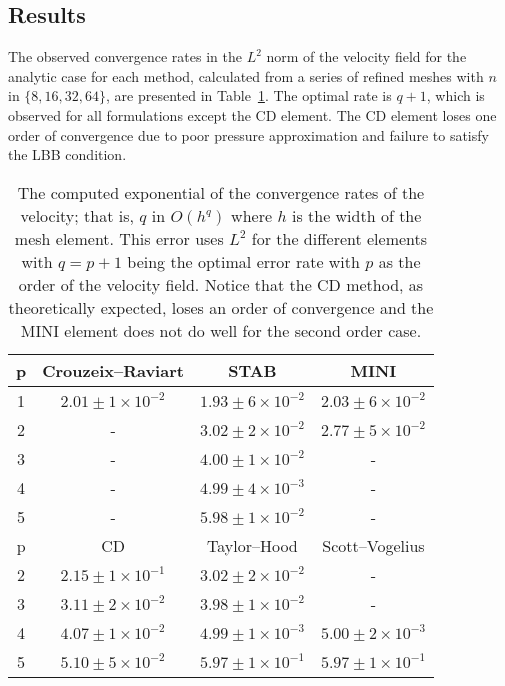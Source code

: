 \subsection{Results}

The observed convergence rates in the $L^{2}$ norm of the velocity
field for the analytic case for each method, calculated from a series
of refined meshes with $n$ in $\{8, 16, 32, 64\}$, are presented in
Table~\ref{tab:terrel:vel_error}. The optimal rate is $q + 1$, which is
observed for all formulations except the CD element.  The CD element
loses one order of convergence due to poor pressure approximation and
failure to satisfy the LBB condition.

\begin{table}[!t]
\centering
  \small
  \begin{tabular}{cccc}
    \toprule
    p  & Crouzeix--Raviart &  STAB &  MINI \\
    \midrule
    1 & $2.01\pm 1 \times 10^{-2}$ & $1.93\pm 6 \times 10^{-2}$ & $2.03\pm 6 \times 10^{-2}$ \\
    2 & -                          & $3.02\pm 2 \times 10^{-2}$ & $2.77\pm 5 \times 10^{-2}$ \\
    3 & -                          & $4.00\pm 1 \times 10^{-2}$ & - \\
    4 & -                          & $4.99\pm 4 \times 10^{-3}$ & - \\
    5 & -                          & $5.98\pm 1 \times 10^{-2}$ & -\\
    \midrule
    p  &  CD  & Taylor--Hood & Scott--Vogelius \\
    \midrule
    2 & $2.15 \pm 1 \times 10^{-1}$ & $3.02 \pm 2 \times 10^{-2}$ & -  \\
    3 & $3.11 \pm 2 \times 10^{-2}$ & $3.98 \pm 1 \times 10^{-2}$ & -  \\
    4 & $4.07 \pm 1 \times 10^{-2}$ & $4.99 \pm 1 \times 10^{-3}$ & $5.00 \pm 2 \times 10^{-3}$\\
    5 & $5.10 \pm 5 \times 10^{-2}$ & $5.97 \pm 1 \times 10^{-1}$ & $5.97 \pm 1 \times 10^{-1}$\\
    \bottomrule
   \end{tabular}
  \caption{The computed exponential of the convergence rates of the
  velocity; that is, $q$ in $O(h^q)$ where $h$ is the width of the mesh
  element. This error uses $L^2$ for the different elements with $q=p+1$
  being the optimal error rate with $p$ as the order of the velocity
  field.  Notice that the CD method, as theoretically expected, loses
  an order of convergence and the MINI element does not do well for the
  second order case. }\label{tab:terrel:vel_error}
\end{table}



